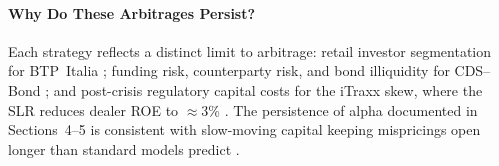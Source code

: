 \paragraph{Why Do These Arbitrages Persist?}
Each strategy reflects a distinct limit to arbitrage: retail investor
segmentation for BTP~Italia \citep{vayanos2021preferred}; funding risk,
counterparty risk, and bond illiquidity for CDS--Bond
\citep{bai2019cds, mitchell2012arbitrage}; and post-crisis
regulatory capital costs for the iTraxx skew, where the SLR reduces
dealer ROE to $\approx$3\%
\citep{boyarchenko2016trends, oehmke2017anatomy}.
The persistence of alpha documented in Sections~4--5 is consistent with
slow-moving capital keeping mispricings open longer than standard
models predict \citep{duffie2010presidential, mitchell2007slow}.